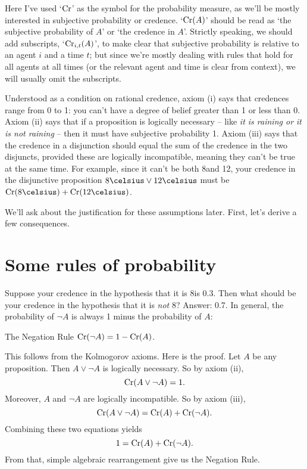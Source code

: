 Here I've used `$\text{Cr}$' as the symbol for the probability measure, as
we'll be mostly interested in subjective probability or credence.
`$\text{Cr}(A)$' should be read as `the subjective probability of $A$' or
`the credence in $A$'. Strictly speaking, we should add subscripts,
`$\text{Cr}_{i,t}(A)$', to make clear that subjective probability is relative
to an agent $i$ and a time $t$; but since we're mostly dealing with
rules that hold for all agents at all times (or the relevant agent and
time is clear from context), we will usually omit the subscripts.

Understood as a condition on rational credence, axiom (i) says that
credences range from 0 to 1: you can't have a degree of belief greater
than 1 or less than 0. Axiom (ii) says that if a proposition is
logically necessary -- like \emph{it is raining or it is not raining}
-- then it must have subjective probability 1. Axiom (iii) says that
the credence in a disjunction should equal the sum of the credence in
the two disjuncts, provided these are logically incompatible, meaning
they can't be true at the same time. For example, since it can't be
both 8\celsius and 12\celsius, your credence in the disjunctive
proposition $8\celsius \lor 12\celsius$ must be
$\Cr(\text{8\celsius}) + \Cr(\text{12\celsius})$.

We'll ask about the justification for these assumptions later. First,
let's derive a few consequences.


\section{Some rules of probability}

Suppose your credence in the hypothesis that it is 8\celsius is
0.3. Then what should be your credence in the hypothesis that it is
\emph{not} 8\celsius? Answer: 0.7. In general, the probability of
$\neg A$ is always 1 minus the probability of $A$:

\begin{genericthm}{The Negation Rule}
  $\text{Cr}(\neg A) = 1 - \text{Cr}(A)$.
\end{genericthm}

This follows from the Kolmogorov axioms. Here is the proof. Let $A$ be
any proposition. Then $A \lor \neg A$ is logically necessary. So by
axiom (ii),
\[
  \text{Cr}(A \lor \neg A) = 1.
\]
Moreover, $A$ and $\neg A$ are logically incompatible. So by axiom
(iii),
\[
  \text{Cr}(A \lor \neg A) = \text{Cr}(A) + \text{Cr}(\neg A).
\]
Combining these two equations yields
\[
  1 = \text{Cr}(A) + \text{Cr}(\neg A).
\]
From that, simple algebraic rearrangement give us the Negation Rule.

